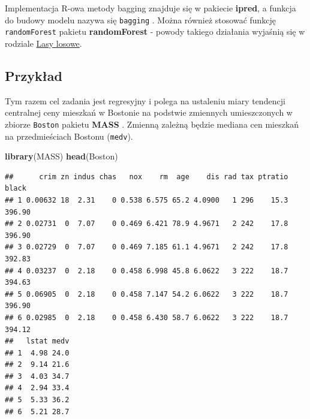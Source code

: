\documentclass[]{book}
\newenvironment{Shaded}{\begin{snugshade}}{\end{snugshade}}
\newcommand{\DataTypeTok}[1]{\textcolor[rgb]{0.13,0.29,0.53}{#1}}
\newcommand{\DecValTok}[1]{\textcolor[rgb]{0.00,0.00,0.81}{#1}}
\newcommand{\KeywordTok}[1]{\textcolor[rgb]{0.13,0.29,0.53}{\textbf{#1}}}
\newcommand{\NormalTok}[1]{#1}
\newcommand{\OperatorTok}[1]{\textcolor[rgb]{0.81,0.36,0.00}{\textbf{#1}}}
\newcommand{\StringTok}[1]{\textcolor[rgb]{0.31,0.60,0.02}{#1}}
\theoremstyle{plain}
\theoremstyle{definition}
\begin{document}
Implementacja R-owa metody bagging znajduje się w pakiecie \textbf{ipred}, a funkcja do budowy modelu nazywa się \texttt{bagging} \citep{R-ipred}. Można również stosować funkcję \texttt{randomForest} pakietu \textbf{randomForest} \citep{R-las} - powody takiego działania wyjaśnią się w rodziale \protect\hyperlink{lasy-losowe}{Lasy losowe}.

\hypertarget{przyk51}{%
\subsection{Przykład}\label{przyk51}}

Tym razem cel zadania jest regresyjny i polega na ustaleniu miary tendencji centralnej ceny mieszkań w Bostonie na podstwie zmiennych umieszczonych w zbiorze \texttt{Boston} pakietu \textbf{MASS} \citep{R-MASS}. Zmienną zależną będzie mediana cen mieszkań na przedmieściach Bostonu (\texttt{medv}).

\begin{Shaded}
\begin{Highlighting}[]
\KeywordTok{library}\NormalTok{(MASS)}
\KeywordTok{head}\NormalTok{(Boston)}
\end{Highlighting}
\end{Shaded}

\begin{verbatim}
##      crim zn indus chas   nox    rm  age    dis rad tax ptratio  black
## 1 0.00632 18  2.31    0 0.538 6.575 65.2 4.0900   1 296    15.3 396.90
## 2 0.02731  0  7.07    0 0.469 6.421 78.9 4.9671   2 242    17.8 396.90
## 3 0.02729  0  7.07    0 0.469 7.185 61.1 4.9671   2 242    17.8 392.83
## 4 0.03237  0  2.18    0 0.458 6.998 45.8 6.0622   3 222    18.7 394.63
## 5 0.06905  0  2.18    0 0.458 7.147 54.2 6.0622   3 222    18.7 396.90
## 6 0.02985  0  2.18    0 0.458 6.430 58.7 6.0622   3 222    18.7 394.12
##   lstat medv
## 1  4.98 24.0
## 2  9.14 21.6
## 3  4.03 34.7
## 4  2.94 33.4
## 5  5.33 36.2
## 6  5.21 28.7
\end{verbatim}

\begin{Shaded}
\end{Shaded}
\end{document}
